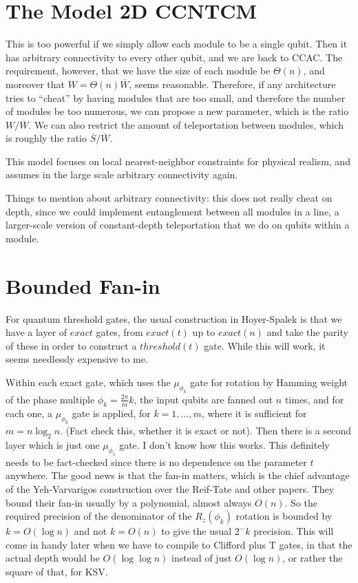 \documentclass{article}
\begin{document}
\section{The Model \textsf{2D CCNTCM}}

This is too powerful if we simply allow each module to be a single
qubit. Then it has arbitrary connectivity to every other qubit,
and we are back to CCAC. The requirement, however, that we have
the size of each module be $\Theta(n)$,
and moreover that $W = \Theta(n)\overline{W}$,
seems reasonable. Therefore, if any architecture tries to ``cheat'' by
having modules that are too small, and therefore the number of modules
be too numerous, we can propose a new parameter, which is the ratio
$W / \overline{W}$. We can also restrict the amount of teleportation
between modules, which is roughly the ratio $\overline{S} / \overline{W}$.

This model focuses on local nearest-neighbor constraints for physical
realism, and assumes in the large scale arbitrary connectivity again.

Things to mention about arbitrary connectivity: this does not really
cheat on depth, since we could implement entanglement between
all modules in a line, a larger-scale version of constant-depth
teleportation that we do on qubits within a module.

\section{Bounded Fan-in}

For quantum threshold gates, the usual construction in Hoyer-Spalek is
that we have a layer of $exact$ gates, from $exact(t)$ up to $exact(n)$
and take the parity of these in order to construct a
$threshold(t)$ gate. While this will work, it seems needlessly expensive
to me.

Within each exact gate, which uses the $\mu_{\phi_k}$ gate for
rotation by Hamming weight of the phase multiple $\phi_k = \frac{2\pi}{m}k$,
the input qubits are fanned out $n$ times, and for each one,
a $\mu_{\phi_k}$ gate is applied, for $k=1,\ldots, m$, where it is
sufficient for $m = n\log_2 n$. (Fact check this, whether it is
exact or not). Then there is a second layer which is just one
$\mu_{\phi_1}$ gate. I don't know how this works. This definitely needs
to be fact-checked since there is no dependence on the parameter $t$
anywhere. The good news is that the fan-in matters, which is the chief
advantage of the Yeh-Varvarigos construction over the Reif-Tate and
other papers. They bound their fan-in usually by a polynomial,
almost always $O(n)$. So the required precision of the denominator of
the
$R_z(\phi_k)$ rotation is bounded by $k = O(\log n)$ and not
$k = O(n)$ to give the usual $2^-k$ precision. This will come in handy
later when we have to compile to Clifford plus T gates, in that the
actual depth would be $O(\log \log n)$ instead of just $O(\log n)$,
or rather the square of that, for KSV.
\end{document}

